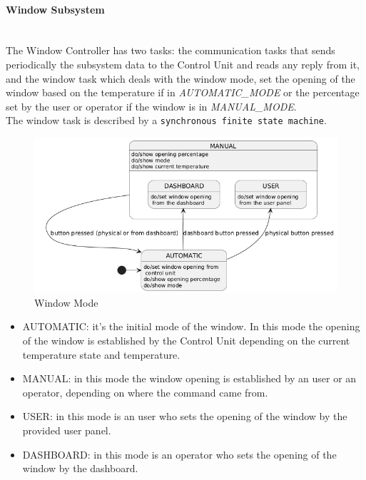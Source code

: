 \documentclass[a4paper,12pt]{report}
\begin{document}
            \newpage
            \paragraph{Window Subsystem\\}
                \ \\
                The Window Controller has two tasks: the communication tasks that sends periodically the subsystem data to the Control Unit 
                and reads any reply from it, and the window task which deals with the window mode, set the opening of the window based on 
                the temperature if in \textit{AUTOMATIC\_MODE} or the percentage set by the user or operator if the window is in 
                \textit{MANUAL\_MODE}.\\
                The window task is described by a \texttt{synchronous finite state machine}.
    
                \begin{figure}[H]
                    \centering{}
                    \includegraphics[width=\textwidth]{uml/img/WindowModeUML.png}
                    \caption{Window Mode}
                    \label{img:window_mode}
                \end{figure}
    
                \begin{itemize}
                    \item AUTOMATIC: it's the initial mode of the window. In this mode the opening of the window is established by the 
                    Control Unit depending on the current temperature state and temperature. 
                    \item MANUAL: in this mode the window opening is established by an user or an operator, depending on where the command 
                    came from.
                    \item USER: in this mode is an user who sets the opening of the window by the provided user panel.
                    \item DASHBOARD: in this mode is an operator who sets the opening of the window by the dashboard.
                \end{itemize}
    
\end{document}
